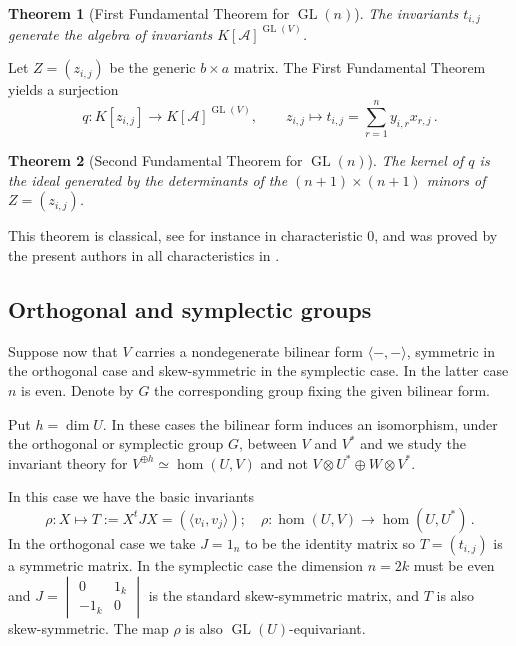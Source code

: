 \documentclass[10pt]{amsart}
\newtheorem{theorem}{Theorem}[section]
\theoremstyle{definition}
\theoremstyle{remark}
\newcommand{\GL}{\operatorname{GL}}
\begin{document}
\begin{theorem}[First Fundamental Theorem for $\GL(n)$]
The invariants $t_{i,j}$ generate the algebra of invariants $K[\mathcal A]^{ \GL(V)}$.\end{theorem}

Let $Z=(z_{i,j})$ be the generic $b\times a$ matrix.  The First Fundamental Theorem yields a surjection
\begin{equation}\label{acco1}
q:K[z_{i,j}]\longrightarrow K[\mathcal A]^{ \GL(V)},\qquad z_{i,j}\longmapsto t_{i,j}=\sum_{r=1}^ny_{i,r}x_{r,j}\,.
\end{equation}


\begin{theorem}[Second Fundamental Theorem for $\GL(n)$]
The kernel of $q$ is the ideal generated by the determinants of the $(n+1)\times(n+1)$ minors of $Z=(z_{i,j})$.
\end{theorem}
This theorem is classical, see for instance \cite{Weyl}  in characteristic 0, and was proved by the present authors in all characteristics in  \cite{DeConciniProcesi1976}.
\subsection{Orthogonal and symplectic groups}

Suppose now that $V$ carries a nondegenerate bilinear form $\langle-,-\rangle$, symmetric in the orthogonal case and skew-symmetric in the symplectic case.  In the latter case $n$ is even.   Denote by $G$ the corresponding group fixing the given bilinear form.\smallskip



Put $h=\dim U$. In these cases the bilinear form induces an isomorphism, under the orthogonal or symplectic group $G$,   between $V$ and $V^*$ and   we study the invariant theory for $ V^{\oplus h}
\simeq  \hom(U,V)$  and not $V\otimes U^*\oplus W\otimes V^*$.\smallskip

In this case  
we have the basic invariants
\[
 \rho:  X\mapsto T:=X^tJ X=(\langle v_i,v_j\rangle);\quad  \rho: \hom(U,V)\to \hom(U,U^*)\,.
\]
In the orthogonal case we take $J=1_n$ to be the identity matrix so $T=(t_{i,j})$ is a symmetric matrix.  In the  symplectic case the dimension $n=2k$ must be even and $J=\begin{vmatrix}
0&1_k\\-1_k&0
\end{vmatrix}$  is the standard     skew-symmetric matrix, and $T$ is also skew-symmetric.  The map $\rho$ is also $\GL(U)$-equivariant.
\end{document}
